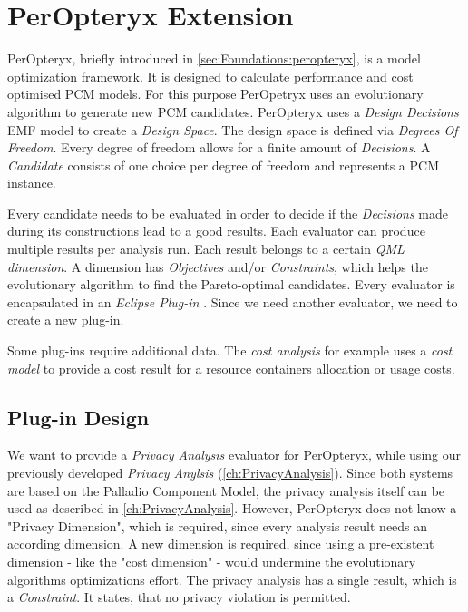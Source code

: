 \chapter{PerOpteryx Extension}
\label{ch:PerOpt}

PerOpteryx, briefly introduced in \autoref{sec:Foundations:peropteryx}, is a model optimization framework. It is designed to calculate performance and cost optimised PCM models. For this purpose PerOpetryx uses an evolutionary algorithm to generate new PCM candidates. PerOpteryx uses a \textit{Design Decisions} EMF model to create a \textit{Design Space}. The design space is defined via \textit{Degrees Of Freedom}. Every degree of freedom allows for a finite amount of \textit{Decisions}. A \textit{Candidate} consists of one choice per degree of freedom and represents a PCM instance. 

Every candidate needs to be evaluated in order to decide if the \textit{Decisions} made during its constructions lead to a good results. Each evaluator can produce multiple results per analysis run. Each result belongs to a certain \textit{QML dimension}. A dimension has \textit{Objectives} and/or \textit{Constraints}, which helps the evolutionary algorithm to find the Pareto-optimal candidates. Every evaluator is encapsulated in an \textit{Eclipse Plug-in} \cite{PerOpteryx.b}. Since we need another evaluator, we need to create a new plug-in.

Some plug-ins require additional data. The \textit{cost analysis} for example uses a \textit{cost model} to provide a cost result for a resource containers allocation or usage costs. 

\section{Plug-in Design}
\label{sec:PerOpt:design}

We want to provide a \textit{Privacy Analysis} evaluator for PerOpteryx, while using our previously developed \textit{Privacy Anylsis} (\autoref{ch:PrivacyAnalysis}). Since both systems are based on the Palladio Component Model, the privacy analysis itself can be used as described in \autoref{ch:PrivacyAnalysis}. However, PerOpteryx does not know a "Privacy Dimension", which is required, since every analysis result needs an according dimension. A new dimension is required, since using a pre-existent dimension - like the "cost dimension" - would undermine the evolutionary algorithms optimizations effort. The privacy analysis has a single result, which is a \textit{Constraint}. It states, that no privacy violation is permitted.

